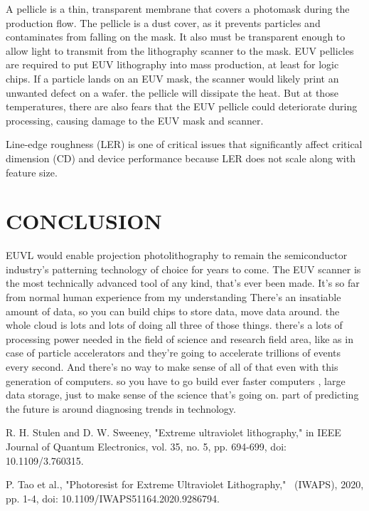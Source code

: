 \documentclass[12pt,a4paper]{report}
\begin{document}
\begin{itemize}
A pellicle is a thin, transparent membrane that covers a 
photomask during the production flow. The pellicle is a dust 
cover, as it prevents particles and contaminates from falling 
on the mask. It also must be transparent enough to allow light 
to transmit from the lithography scanner to the mask.
EUV pellicles are required to put EUV lithography into mass 
production, at least for logic chips. If a particle lands on 
an EUV mask, the scanner would likely print an unwanted defect 
on a wafer.
the pellicle will dissipate the heat. But at those temperatures, 
there are also fears that the EUV pellicle could deteriorate 
during processing, causing damage to the EUV mask and scanner.



Line-edge
roughness (LER) is one of critical issues that significantly 
affect critical dimension (CD) and device
performance because LER does not scale along with feature size.

\chapter{CONCLUSION}
EUVL would enable projection photolithography to remain the 
semiconductor industry’s patterning technology of choice 
for years to come. The EUV scanner is the most technically 
advanced tool of any kind, that's ever been made. 
It's so far from
normal human experience from my understanding
There's an insatiable amount of data, so you can build chips to store data, move data around. the whole cloud is lots
and lots of doing all three of those things. 
there's a lots of processing power needed in the field of science and research field area, like as in case 
of  particle accelerators and they're going to accelerate 
trillions of events every second. And there's no way to make 
sense of all of that even with this generation of computers. so you have to go build ever faster computers
, large data storage, just to make sense of the science that's going on. part of predicting the future is around
diagnosing trends in technology.



\begin{thebibliography}{99}

R. H. Stulen and D. W. Sweeney, "Extreme ultraviolet lithography," in IEEE Journal of Quantum Electronics, 
      vol. 35, no. 5, pp. 694-699, doi: 10.1109/3.760315.

P. Tao et al., "Photoresist for Extreme Ultraviolet Lithography,"  (IWAPS), 2020, pp. 1-4, 
     doi: 10.1109/IWAPS51164.2020.9286794.


\end{thebibliography}
\end{itemize}
\end{document}

